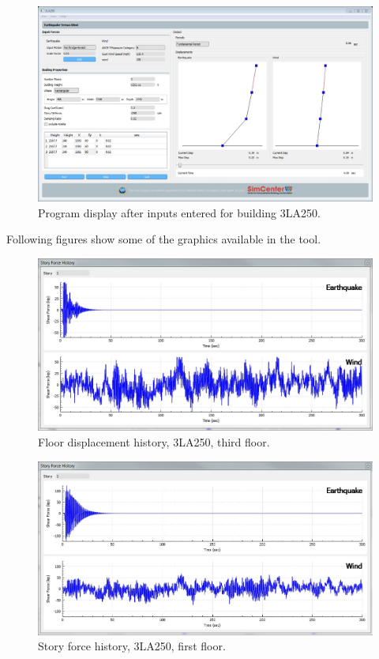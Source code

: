 \documentclass[onecolumn, fleqn]{article}
\begin{document}
\begin{figure}[H]
	\centering \includegraphics[width=0.9\linewidth]{3LA250_1.JPG}
	\caption{Program display after inputs entered for building 3LA250.}
\end{figure}
Following figures show some of the graphics available in the tool.
\begin{figure}[H]
	\centering \includegraphics[scale=0.35]{3LA250_fdh.JPG}
	\caption{Floor displacement history, 3LA250, third floor.}
\end{figure}
\begin{figure}[H]
	\centering \includegraphics[scale=0.35]{3LA250_sfh.JPG}
	\caption{Story force history, 3LA250, first floor.}
\end{figure}
\end{document}
